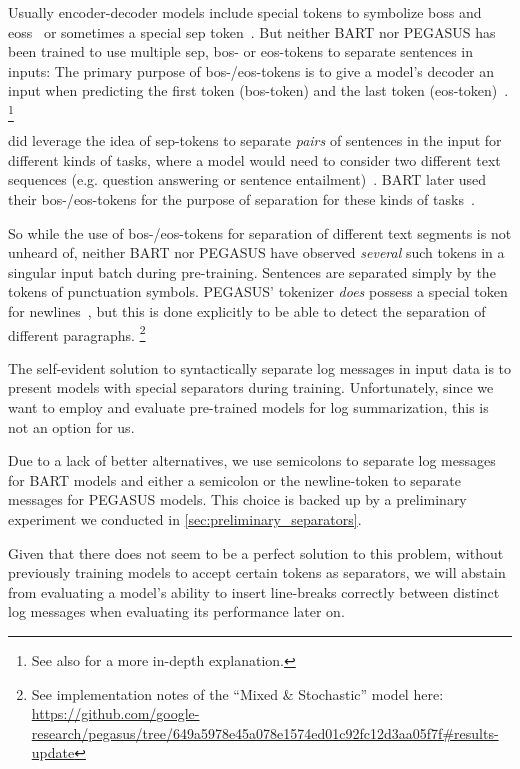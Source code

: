 Usually encoder-decoder models include special tokens to symbolize \acp{bos} and \acp{eos}~\parencite[3]{seq2seq} or sometimes a special \ac{sep} token~\parencite[4174]{bert}.
But neither BART nor PEGASUS has been trained to use multiple \ac{sep}, \ac{bos}- or \ac{eos}-tokens to separate sentences in inputs:
The primary purpose of \ac{bos}-/\ac{eos}-tokens is to give a model's decoder
an input when predicting the first token (\ac{bos}-token) and the last token (\ac{eos}-token)~\parencite[2-3]{seq2seq}.%
\footnote{See also  for a more in-depth explanation.}

\citeauthor*{bert} did leverage the idea of \ac{sep}-tokens to separate
\emph{pairs} of sentences in the input for different kinds of tasks,
where a model would need to consider two different text sequences (e.g. question answering or sentence entailment)~\parencite[4174]{bert}.
BART later used their \ac{bos}-/\ac{eos}-tokens for the purpose of separation for these kinds of tasks~\parencite[7874]{bart}.

So while the use of \ac{bos}-/\ac{eos}-tokens for separation of different text segments is not unheard of,
neither BART nor PEGASUS have observed \emph{several} such tokens in a singular input batch during pre-training.
Sentences are separated simply by the tokens of punctuation symbols.
PEGASUS' tokenizer \emph{does} possess a special token for newlines~\parencite[11336]{pegasus},
but this is done explicitly to be able to detect the separation of different paragraphs.%
\footnote{See implementation notes of the \enquote{Mixed \& Stochastic} model here: \url{https://github.com/google-research/pegasus/tree/649a5978e45a078e1574ed01c92fc12d3aa05f7f\#results-update}}

The self-evident solution to syntactically separate log messages in input data
is to present models with special separators during training.
Unfortunately, since we want to employ and evaluate pre-trained models for log summarization,
this is not an option for us.

Due to a lack of better alternatives, we use semicolons to separate
log messages for BART models and either a semicolon or the newline-token to separate messages for PEGASUS models.
This choice is backed up by a preliminary experiment we conducted in \autoref{sec:preliminary_separators}.

Given that there does not seem to be a perfect solution to this problem,
without previously training models to accept certain tokens as separators,
we will abstain from evaluating a model's ability to insert line-breaks correctly
between distinct log messages when evaluating its performance later on.


